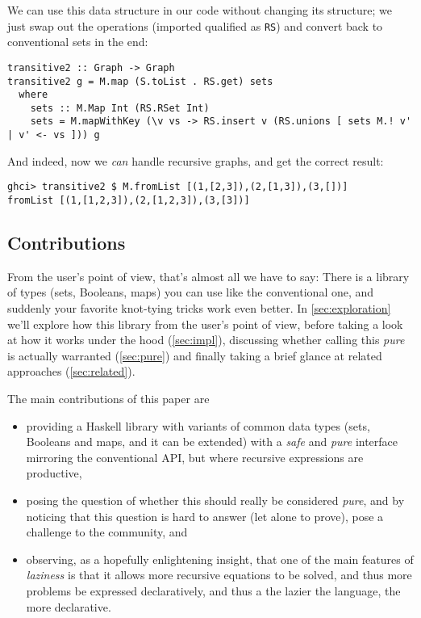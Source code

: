 \documentclass[manuscript,screen,acmsmall]{acmart}
\begin{document}
We can use this data structure in our code without changing its structure; we just swap out the operations (imported qualified as \verb|RS|) and convert back to conventional sets in the end:
\begin{verbatim}
transitive2 :: Graph -> Graph
transitive2 g = M.map (S.toList . RS.get) sets
  where
    sets :: M.Map Int (RS.RSet Int)
    sets = M.mapWithKey (\v vs -> RS.insert v (RS.unions [ sets M.! v' | v' <- vs ])) g
\end{verbatim}

And indeed, now we \emph{can} handle recursive graphs, and get the correct result:
\begin{verbatim}
ghci> transitive2 $ M.fromList [(1,[2,3]),(2,[1,3]),(3,[])]
fromList [(1,[1,2,3]),(2,[1,2,3]),(3,[3])]
\end{verbatim}

\subsection{Contributions}

From the user’s point of view, that’s almost all we have to say: There is a library of types (sets, Booleans, maps) you can use like the conventional one, and suddenly your favorite knot-tying tricks work even better. In \cref{sec:exploration} we'll explore how this library from the user's point of view, before taking a look at how it works under the hood (\cref{sec:impl}), discussing whether calling this \emph{pure} is actually warranted (\cref{sec:pure}) and finally taking a brief glance at related approaches (\cref{sec:related}).

The main contributions of this paper are
\begin{itemize}
\item providing a Haskell library with variants of common data types (sets, Booleans and maps, and it can be extended) with a \emph{safe} and \emph{pure} interface mirroring the conventional API, but where recursive expressions are productive,
\item posing the question of whether this should really be considered \emph{pure}, and by noticing that this question is hard to answer (let alone to prove), pose a challenge to the community, and
\item observing, as a hopefully enlightening insight, that one of the main features of \emph{laziness} is that it allows more recursive equations to be solved, and thus more problems be expressed declaratively, and thus a the lazier the language, the more declarative.
\end{itemize}
\end{document}
